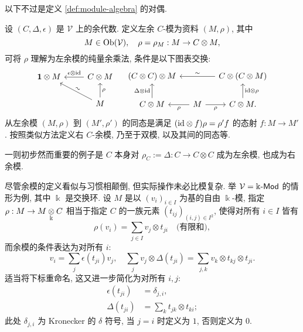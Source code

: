 以下不过是定义 \ref{def:module-algebra} 的对偶.

\begin{definition}[余模]\label{def:comodule-cogebra}
	设 $(C, \Delta, \epsilon)$ 是 $\mathcal{V}$ 上的余代数. 定义左余 $C$-模为资料 $(M, \rho)$, 其中
	\[ M \in \operatorname{Ob}(\mathcal{V}), \quad \rho = \rho_M : M \to C \otimes M, \]
	可将 $\rho$ 理解为左余模的纯量余乘法, 条件是以下图表交换:
	\[\begin{tikzcd}
		\munit \otimes M & C \otimes M \arrow[l, "{\epsilon \otimes \identity}"'] \\
		& M \arrow[u, "{\rho}"'] \arrow[lu, "\sim" sloped]
	\end{tikzcd} \quad \begin{tikzcd}[column sep=small]
		(C \otimes C) \otimes M & & C \otimes (C \otimes M) \arrow[ll, "\sim"'] \\
		C \otimes M \arrow[u, "{\Delta \otimes \identity}"] & M \arrow[l, "{\rho}"] \arrow[r, "{\rho}"'] & C \otimes M. \arrow[u, "{\identity \otimes \rho}"']
	\end{tikzcd}\]
	从左余模 $(M, \rho)$ 到 $(M', \rho')$ 的同态是满足 $(\mathrm{id} \otimes f) \rho = \rho' f$ 的态射 $f: M \to M'$. 按照类似方法定义右 $C$-余模, 乃至于双模, 以及其间的同态等.
\end{definition}

一则初步然而重要的例子是 $C$ 本身对 $\rho_C := \Delta: C \to C \otimes C$ 成为左余模, 也成为右余模.

尽管余模的定义看似与习惯相颠倒, 但实际操作未必比模复杂. 举 $\mathcal{V} = \Bbbk\text{-}\mathsf{Mod}$ 的情形为例, 其中 $\Bbbk$ 是交换环. 设 $M$ 是以 $(v_i)_{i \in I}$ 为基的自由 $\Bbbk$-模, 指定 $\rho: M \to M \underset{\Bbbk}{\otimes} C$ 相当于指定 $C$ 的一族元素 $(t_{ij})_{(i, j) \in I^2}$, 使得对所有 $i \in I$ 皆有
\begin{equation*}
	\rho(v_i) = \sum_{j \in I} v_j \otimes t_{ji} \quad \text{(有限和)},
\end{equation*}
而余模的条件表达为对所有 $i$:
\begin{equation*}
	v_i = \sum_j \epsilon(t_{ji}) v_j, \quad \sum_j v_j \otimes \Delta(t_{ji}) = \sum_{j, k} v_k \otimes t_{kj}  \otimes t_{ji}.
\end{equation*}
适当将下标重命名, 这又进一步简化为对所有 $i, j$:
\begin{equation}\label{eqn:comodule-matrix}
	\begin{aligned}
		\epsilon(t_{ji}) & = \delta_{j, i}, \\
		\Delta(t_{ji}) & = \sum_k t_{jk} \otimes t_{ki};
	\end{aligned}
\end{equation}
此处 $\delta_{j, i}$ 为 Kronecker 的 $\delta$ 符号, 当 $j=i$ 时定义为 $1$, 否则定义为 $0$.

